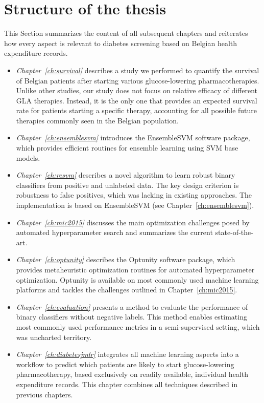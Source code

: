 \section{Structure of the thesis} \label{intro:structure}
This Section summarizes the content of all subsequent chapters  and reiterates how every aspect is relevant to diabetes screening based on Belgian health expenditure records.

\newcommand{\chapteritem}[2]{\item \emph{Chapter~\ref{ch:#1}} #2}
\begin{itemize}

\chapteritem{survival} describes a study we performed to quantify the survival of Belgian patients after starting various glucose-lowering pharmacotherapies. Unlike other studies, our study does not focus on relative efficacy of different GLA therapies. Instead, it is the only one that provides an expected survival rate for patients starting a specific therapy, accounting for all possible future therapies commonly seen in the Belgian population.

\chapteritem{ensemblesvm}{introduces the EnsembleSVM software package, which provides efficient routines for ensemble learning using SVM base models.}

\chapteritem{resvm}{describes a novel algorithm to learn robust binary classifiers from positive and unlabeled data. The key design criterion is robustness to false positives, which was lacking in existing approaches. The implementation is based on EnsembleSVM (see Chapter~\ref{ch:ensemblesvm}).}

\chapteritem{mic2015}{discusses the main optimization challenges posed by automated hyperparameter search and summarizes the current state-of-the-art.}

\chapteritem{optunity}{describes the Optunity software package, which provides metaheuristic optimization routines for automated hyperparameter optimization. Optunity is available on most commonly used machine learning platforms and tackles the challenges outlined in Chapter~\ref{ch:mic2015}.}

\chapteritem{evaluation}{presents a method to evaluate the performance of binary classifiers without negative labels. This method enables estimating most commonly used performance metrics in a semi-supervised setting, which was uncharted territory.}

\chapteritem{diabetesjmlr}{integrates all machine learning aspects into a workflow to predict which patients are likely to start glucose-lowering pharmacotherapy, based exclusively on readily available, individual health expenditure records. This chapter combines all techniques described in previous chapters.}

\end{itemize}
